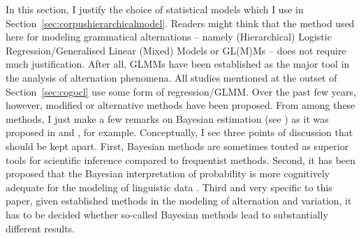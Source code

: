 \documentclass[USenglish]{article}
\begin{document}
In this section, I justify the choice of statistical models which I use in Section~\ref{sec:corpushierarchicalmodel}.
Readers might think that the method used here for modeling grammatical alternations -- namely (Hierarchical) Logistic Regression\slash Generalised Linear (Mixed) Models or GL(M)Ms -- does not require much justification.
After all, GLMMs have been established as the major tool in the analysis of alternation phenomena.
All studies mentioned at the outset of Section~\ref{sec:cogocl} use some form of regression\slash GLMM.
Over the past few years, however, modified or alternative methods have been proposed.
From among these methods, I just make a few remarks on Bayesian estimation (see \citealp{GelmanEa2014}) as it was proposed in \cite{Levshina2016} and \cite{Divjak2016a}, for example.
Conceptually, I see three points of discussion that should be kept apart.
First, Bayesian methods are sometimes touted as superior tools for scientific inference compared to frequentist methods.
Second, it has been proposed that the Bayesian interpretation of probability is more cognitively adequate for the modeling of linguistic data \cite[301--302]{Divjak2016a}.
Third and very specific to this paper, given established methods in the modeling of alternation and variation, it has to be decided whether so-called Bayesian methods lead to substantially different results.
\end{document}
